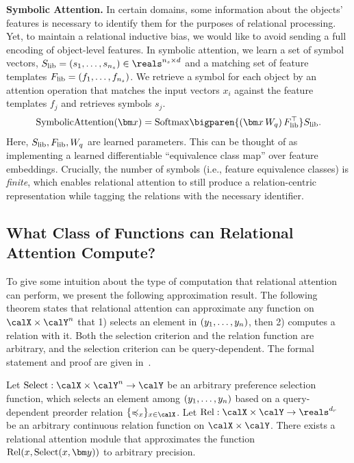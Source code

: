\textbf{Symbolic Attention.} In certain domains, some information about the objects' features is necessary to identify them for the purposes of relational processing. Yet, to maintain a relational inductive bias, we would like to avoid sending a full encoding of object-level features. In symbolic attention, we learn a set of symbol vectors, $\Slib = (s_1, \ldots, s_{n_s}) \in \reals^{n_s \times d}$ and a matching set of feature templates $F_\mathrm{lib} = (f_1, \ldots, f_{n_s})$. We retrieve a symbol for each object by an attention operation that matches the input vectors $x_i$ against the feature templates $f_j$ and retrieves symbols $s_j$.
\begin{equation}
  \SymbolicAttn(\x) = \Softmax\bigparen{(\x \, W_q)\, \Flib^\top} \Slib.
\end{equation}
Here, $S_\mathrm{lib}, F_\mathrm{lib}, W_q$ are learned parameters. This can be thought of as implementing a learned differentiable ``equivalence class map'' over feature embeddings. Crucially, the number of symbols (i.e., feature equivalence classes) is \textit{finite}, which enables relational attention to still produce a relation-centric representation while tagging the relations with the necessary identifier.


\subsection{What Class of Functions can Relational Attention Compute?}\label{ssec:approx}
To give some intuition about the type of computation that relational attention can perform, we present the following approximation result. The following theorem states that relational attention can approximate any function on $\calX \times \calY^n$ that 1) selects an element in $(y_1, \ldots, y_n)$, then 2) computes a relation with it. Both the selection criterion and the relation function are arbitrary, and the selection criterion can be query-dependent. The formal statement and proof are given in~.
\begin{theorem}[Informal]\label{theorem:func_class}
  Let $\mathrm{Select}: \calX \times \calY^n \to \calY$ be an arbitrary preference selection function, which selects an element among $(y_1, \ldots, y_n)$ based on a query-dependent preorder relation $\{\preceq_x\}_{x \in \calX}$. Let $\mathrm{Rel}: \calX \times \calY \to \reals^{d_r}$ be an arbitrary continuous relation function on $\calX \times \calY$. There exists a relational attention module that approximates the function $\mathrm{Rel}(x, \mathrm{Select}(x, \y))$ to arbitrary precision.
\end{theorem}
